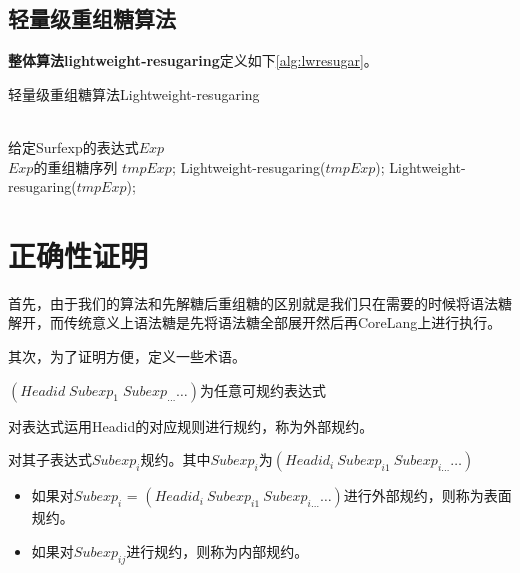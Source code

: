\subsection{轻量级重组糖算法}

{\bfseries 整体算法lightweight-resugaring}定义如下\ref{alg:lwresugar}。

\begin{algorithm}
	\caption{轻量级重组糖算法Lightweight-resugaring}
	\label{alg:lwresugar}     %
	\begin{algorithmic}[1]       %
		\REQUIRE ~~\\      %
		给定Surfexp的表达式$Exp$
		\ENSURE ~~\\     %
		$Exp$的重组糖序列
			\RETURN
			\PRINT $tmpExp$;
			\STATE Lightweight-resugaring($tmpExp$);
			\ELSE 
			\STATE Lightweight-resugaring($tmpExp$);
			\ENDIF
		\ENDWHILE
		
	\end{algorithmic}
\end{algorithm}



\section{正确性证明}

首先，由于我们的算法和先解糖后重组糖的区别就是我们只在需要的时候将语法糖解开，而传统意义上语法糖是先将语法糖全部展开然后再CoreLang上进行执行。

其次，为了证明方便，定义一些术语。

$(Headid\;Subexp_{1}\;Subexp_{\ldots} \ldots)$为任意可规约表达式

对表达式运用Headid的对应规则进行规约，称为外部规约。

对其子表达式$Subexp_{i}$规约。其中$Subexp_{i}$为$(Headid_{i}~Subexp_{i1}~Subexp_{i\ldots} \ldots)$
\begin{itemize}
	\item 如果对$Subexp_{i}$ = $(Headid_{i}~Subexp_{i1}~Subexp_{i\ldots} \ldots)$进行外部规约，则称为表面规约。
	\item 如果对$Subexp_{ij}$进行规约，则称为内部规约。
\end{itemize}

